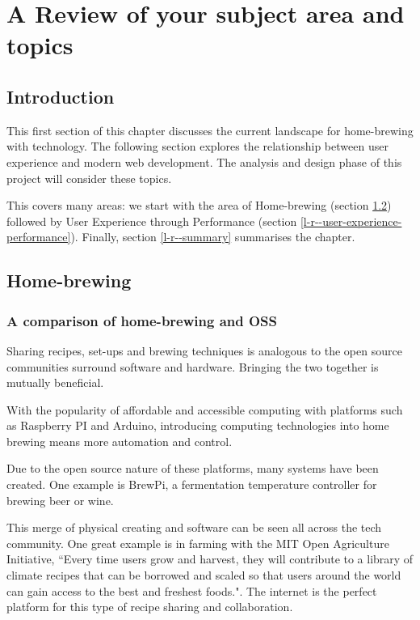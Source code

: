 \chapter{A Review of your subject area and topics}

\section{Introduction} \label{l-r--introduction}

This first section of this chapter discusses the current landscape for home-brewing with technology. The following section explores the relationship between user experience and modern web development. The analysis and design phase of this project will consider these topics.


This covers many areas: we start with the area of Home-brewing (section \ref{l-r--home-brewing}) followed by User Experience through Performance (section \ref{l-r--user-experience-performance}). Finally, section \ref{l-r--summary} summarises the chapter.

\section{Home-brewing} \label{l-r--home-brewing}



\subsection{A comparison of home-brewing and OSS}

Sharing recipes, set-ups and brewing techniques is analogous to the open source communities surround software and hardware. Bringing the two together is mutually beneficial.

With the popularity of affordable and accessible computing with platforms such as Raspberry PI and Arduino, introducing computing technologies into home brewing means more automation and control.

Due to the open source nature of these platforms, many systems have been created. One example is BrewPi, a fermentation temperature controller for brewing beer or wine. \cite{brewpi}

This merge of physical creating and software can be seen all across the tech community. One great example is in farming with the MIT Open Agriculture Initiative, ``Every time users grow and harvest, they will contribute to a library of climate recipes that can be borrowed and scaled so that users around the world can gain access to the best and freshest foods.". The internet is the perfect platform for this type of recipe sharing and collaboration. \cite{climate_recipes}

